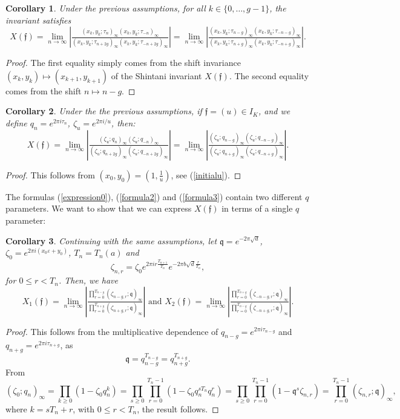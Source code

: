 \documentclass[11pt, a4paper]{amsart}
\newcommand{\ep}{\varepsilon}
\newcommand{\eq}[1]{\begin{equation}#1\end{equation}}
\theoremstyle{plain}
\newtheorem{corollary}{Corollary}[section]
\numberwithin{equation}{section}
\begin{document}
\begin{corollary}
\label{corollary1}
 Under the previous assumptions, for all $k \in \{0,\dots,g-1\}$, the invariant satisfies \eq{\label{formula2}X(\mathfrak f) = \lim_{n\to\infty} \left\vert \tfrac{(x_k,y_k;\tau_n)_\infty(x_k,y_k;\tau_{-n})_\infty}{(x_k,y_k;\tau_{n+2g})_\infty(x_k,y_k;\tau_{-n+2g})_\infty} \right\vert=\lim_{n\to \infty}\left\vert \tfrac{(x_k,y_k;\tau_{n-g})_\infty(x_k,y_k;\tau_{-n-g})_\infty}{(x_k,y_k;\tau_{n+g})_\infty(x_k,y_k;\tau_{-n+g})_\infty} \right\vert.}
\end{corollary}
\begin{proof}
The first equality simply comes from the shift invariance $(x_k,y_k)\mapsto (x_{k+1},y_{k+1})$ of the Shintani invariant $X(\mathfrak f)$. The second equality comes from the shift $n\mapsto n-g$.
\end{proof}
\begin{corollary}
\label{corollary2}
Under the the previous assumptions, if $\mathfrak f = (u) \in I_K$, and we define $q_n = e^{2\pi i \tau_n}$, $\zeta_u = e^{2 \pi i / u}$, then: \eq{\label{formula3}X(\mathfrak f) = \lim_{n\to\infty}\left\vert\tfrac{(\zeta_u;q_n)_\infty(\zeta_u;q_{-n})_\infty}{(\zeta_u;q_{n+2g})_\infty(\zeta_u;q_{-n+2g})_\infty}\right\vert= \lim_{n\to\infty}\left\vert\tfrac{(\zeta_u;q_{n-g})_\infty(\zeta_u;q_{-n-g})_\infty}{(\zeta_u;q_{n+g})_\infty(\zeta_u;q_{-n+g})_\infty}\right\vert.}
\end{corollary}
\begin{proof}
This follows from $(x_0,y_0) = (1,\tfrac 1 u)$, see (\ref{initialu}).
\end{proof}
\noindent
The formulas (\ref{expression0}), (\ref{formula2}) and (\ref{formula3}) contain two different $q$ parameters. We want to show that we can express $X(\mathfrak f)$ in terms of a single $q$ parameter:
\begin{corollary}
\label{corollary3}
Continuing with the same assumptions, let $\mathfrak q = e^{- 2 \pi \sqrt{d}}$, $\zeta_0 = e^{2 \pi i (x_0\ep+y_0)}$, $T_n = T_n(a)$  and \eq{\zeta_{n,r} = \zeta_0 e^{2 \pi i r\frac { T_{n+1}}{T_n}  }e^{-2\pi b \sqrt{d}\frac{r}{T_n}},} for $0\leq r < T_n$. Then, we have
\eq{\label{expression2}X_1(\mathfrak f) = \lim_{n\to \infty} \left \vert \tfrac{\prod_{r=0}^{T_{n-g}} (\zeta_{n-g,r};\mathfrak q)_\infty} {\prod_{r=0}^{T_{n+g}} (\zeta_{n+g,r};\mathfrak q)_\infty} \right \vert \text{ and } X_2(\mathfrak f) = \lim_{n\to \infty} \left \vert \tfrac{\prod_{r=0}^{T_{n+g}} (\zeta_{-n-g,r};\mathfrak q)_\infty} {\prod_{r=0}^{T_{n-g}} (\zeta_{-n+g,r};\mathfrak q)_\infty} \right \vert .}

\end{corollary}
\begin{proof}
This follows from the multiplicative dependence of $q_{n-g} = e^{2 \pi i \tau_{n-g}}$ and $q_{n+g}= e^{2 \pi i \tau_{n+g}}$, as  \eq{ \mathfrak q = q_{n-g}^{T_{n-g}} = q_{n+g}^{T_{n+g}}.} From \eq{ (\zeta_0;q_{n})_\infty =  \prod_{k\geq 0}(1-\zeta_0q_{n}^k) = \prod_{s\geq 0}\prod_{r=0}^{T_{n}-1} (1-\zeta_0 q_n^{sT_{n}}q_{n}^{r}) = \prod_{s\geq0} \prod_{r=0}^{T_{n}-1}(1-\mathfrak q^s \zeta_{n,r}) = \prod_{r=0}^{T_{n} -1}(\zeta_{n,r};\mathfrak q)_\infty,} where $k = s T_n + r$, with $0\leq r < T_{n}$, the result follows. 
\end{proof}
\end{document}
